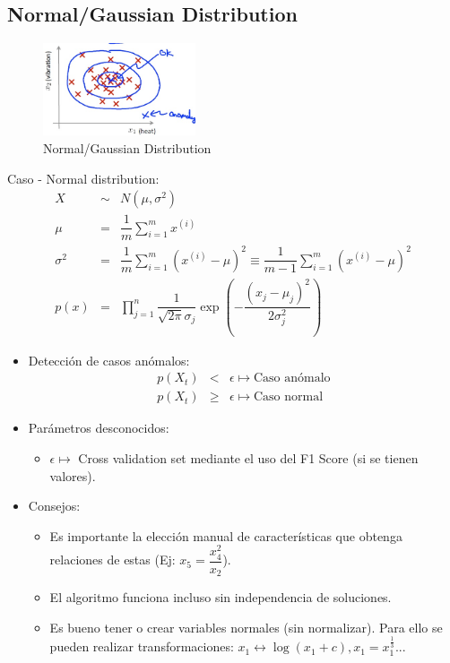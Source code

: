 \documentclass[12pt,a4paper]{article}
\begin{document}
\newpage

\subsection{Normal/Gaussian Distribution}

\begin{figure}[htb]
\center
\includegraphics[width=0.4\textwidth]{norm_dist}
\caption{Normal/Gaussian Distribution}
\end{figure}

Caso - Normal distribution:
\begin{eqnarray*}
X &\sim& N(\mu,\sigma^{2})\\
\mu &=& \dfrac{1}{m} \sum_{i=1}^{m} x^{(i)}\\
\sigma^{2} &=& \dfrac{1}{m} \sum_{i=1}^{m} (x^{(i)}-\mu)^2 \equiv \dfrac{1}{m-1} \sum_{i=1}^{m} (x^{(i)}-\mu)^2 \\
p(x) &=& \prod_{j=1}^{n} \dfrac{1}{\sqrt{2 \pi} \sigma_{j}} \exp(- \dfrac{(x_j-\mu_j)^2}{2\sigma_j^{2}}) 
\end{eqnarray*}




\begin{itemize}
\item Detección de casos anómalos:
\begin{eqnarray*}
 p(X_t) & < & \epsilon \longmapsto \mbox{Caso anómalo}\\
 p(X_t) & \geq & \epsilon \longmapsto \mbox{Caso normal}
\end{eqnarray*}

\item Parámetros desconocidos:
\begin{itemize}
\item $\epsilon \longmapsto$  Cross validation set mediante el uso del F1 Score (si se tienen valores).
\end{itemize}
\item Consejos:
\begin{itemize}
\item Es importante la elección manual de características que obtenga relaciones de estas (Ej: $x_5=\dfrac{x_4^{2}}{x_{2}}$).
\item El algoritmo funciona incluso sin independencia de soluciones.
\item Es bueno tener o crear variables normales (sin normalizar). Para ello se pueden realizar transformaciones: $x_1 \longleftrightarrow \log(x_1+c), x_1 = x_1^{\frac{1}{3}}$...
\end{itemize}
\end{itemize}
\end{document}
